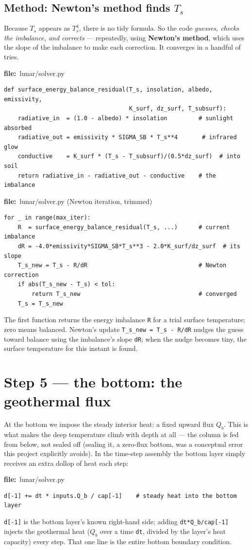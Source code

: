 \documentclass[11pt]{article}
\newcommand{\codefile}[1]{\par\smallskip\noindent
  {\footnotesize\ttfamily\color{teal!55!black}\textbf{file:}~#1}\par\nopagebreak}
\renewcommand{\codefile}[1]{\par\smallskip\noindent
    {\footnotesize\ttfamily\color{black}\textbf{file:}~#1}\par\nopagebreak}
\begin{document}
\subsection{Method: Newton's method finds $T_s$}
Because $T_s$ appears as $T_s^4$, there is no tidy formula. So the code
\emph{guesses, checks the imbalance, and corrects} --- repeatedly, using
\textbf{Newton's method}, which uses the slope of the imbalance to make
each correction. It converges in a handful of tries.
\codefile{lunar/solver.py}
\begin{lstlisting}
def surface_energy_balance_residual(T_s, insolation, albedo, emissivity,
                                    K_surf, dz_surf, T_subsurf):
    radiative_in  = (1.0 - albedo) * insolation         # sunlight absorbed
    radiative_out = emissivity * SIGMA_SB * T_s**4       # infrared glow
    conductive    = K_surf * (T_s - T_subsurf)/(0.5*dz_surf)  # into soil
    return radiative_in - radiative_out - conductive    # the imbalance
\end{lstlisting}
\codefile{lunar/solver.py (Newton iteration, trimmed)}
\begin{lstlisting}
for _ in range(max_iter):
    R  = surface_energy_balance_residual(T_s, ...)      # current imbalance
    dR = -4.0*emissivity*SIGMA_SB*T_s**3 - 2.0*K_surf/dz_surf  # its slope
    T_s_new = T_s - R/dR                                # Newton correction
    if abs(T_s_new - T_s) < tol:
        return T_s_new                                  # converged
    T_s = T_s_new
\end{lstlisting}
\begin{codebox}
The first function returns the energy imbalance \texttt{R} for a trial
surface temperature; zero means balanced. Newton's update
\texttt{T\_s\_new = T\_s - R/dR} nudges the guess toward balance using the
imbalance's slope \texttt{dR}; when the nudge becomes tiny, the surface
temperature for this instant is found.
\end{codebox}

\section{Step 5 --- the bottom: the geothermal flux}
At the bottom we impose the steady interior heat: a fixed upward flux
$Q_b$. This is what makes the deep temperature climb with depth at all ---
the column is fed from below, not sealed off (sealing it, a zero-flux
bottom, was a conceptual error this project explicitly avoids). In the
time-step assembly the bottom layer simply receives an extra dollop of
heat each step:
\codefile{lunar/solver.py}
\begin{lstlisting}
d[-1] += dt * inputs.Q_b / cap[-1]    # steady heat into the bottom layer
\end{lstlisting}
\begin{codebox}
\texttt{d[-1]} is the bottom layer's known right-hand side; adding
\texttt{dt*Q\_b/cap[-1]} injects the geothermal heat ($Q_b$ over a time
\texttt{dt}, divided by the layer's heat capacity) every step. That one
line is the entire bottom boundary condition.
\end{codebox}
\end{document}
